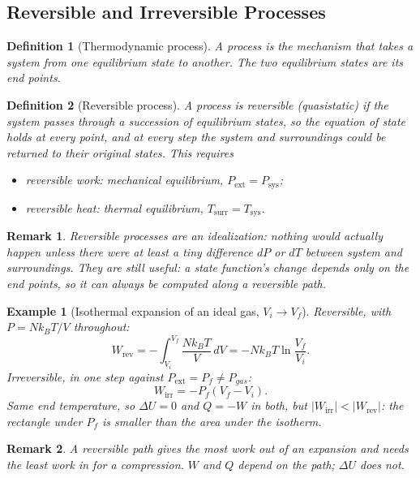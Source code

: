 \documentclass{article}
\newtheorem{definition}{Definition}
\newtheorem*{example}{Example}
\newtheorem{remark}{Remark}
\begin{document}
\subsection{Reversible and Irreversible Processes}
\begin{definition}[Thermodynamic process]
    A process is the mechanism that takes a system from one equilibrium state to another. The two equilibrium states are its end points.
\end{definition}

\begin{definition}[Reversible process]
    A process is reversible (quasistatic) if the system passes through a succession of equilibrium states, so the equation of state holds at every point, and at every step the system and surroundings could be returned to their original states. This requires
    \begin{itemize}
        \item reversible work: mechanical equilibrium, $P_{\text{ext}} = P_{\text{sys}}$;
        \item reversible heat: thermal equilibrium, $T_{\text{surr}} = T_{\text{sys}}$.
    \end{itemize}
\end{definition}
\begin{remark}
    Reversible processes are an idealization: nothing would actually happen unless there were at least a tiny difference $dP$ or $dT$ between system and surroundings. They are still useful: a state function's change depends only on the end points, so it can always be computed along a reversible path.
\end{remark}

\begin{example}[Isothermal expansion of an ideal gas, $V_i \to V_f$]
    Reversible, with $P = Nk_BT/V$ throughout:
    \[W_{\text{rev}} = -\int_{V_i}^{V_f} \frac{Nk_BT}{V}\,dV = -Nk_BT\ln\frac{V_f}{V_i}.\]
    Irreversible, in one step against $P_{\text{ext}} = P_f \neq P_{gas}$:
    \[W_{\text{irr}} = -P_f(V_f - V_i).\]
    Same end temperature, so $\Delta U = 0$ and $Q = -W$ in both, but $|W_{\text{irr}}| < |W_{\text{rev}}|$: the rectangle under $P_f$ is smaller than the area under the isotherm.
\end{example}
\begin{remark}
    A reversible path gives the most work out of an expansion and needs the least work in for a compression. $W$ and $Q$ depend on the path; $\Delta U$ does not.
\end{remark}
\end{document}
